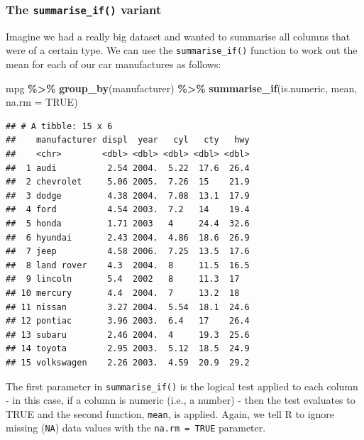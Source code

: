 \documentclass[
]{book}
\newenvironment{Shaded}{\begin{snugshade}}{\end{snugshade}}
\newcommand{\AttributeTok}[1]{\textcolor[rgb]{0.13,0.29,0.53}{#1}}
\newcommand{\ConstantTok}[1]{\textcolor[rgb]{0.56,0.35,0.01}{#1}}
\newcommand{\FunctionTok}[1]{\textcolor[rgb]{0.13,0.29,0.53}{\textbf{#1}}}
\newcommand{\NormalTok}[1]{#1}
\newcommand{\SpecialCharTok}[1]{\textcolor[rgb]{0.81,0.36,0.00}{\textbf{#1}}}
\begin{document}
\hypertarget{the-summarise_if-variant}{%
\subsubsection*{\texorpdfstring{The \texttt{summarise\_if()} variant}{The summarise\_if() variant}}\label{the-summarise_if-variant}}

Imagine we had a really big dataset and wanted to summarise all columns that were of a certain type. We can use the \texttt{summarise\_if()} function to work out the mean for each of our car manufactures as follows:

\begin{Shaded}
\begin{Highlighting}[]
\NormalTok{mpg }\SpecialCharTok{\%\textgreater{}\%} 
  \FunctionTok{group\_by}\NormalTok{(manufacturer) }\SpecialCharTok{\%\textgreater{}\%}
  \FunctionTok{summarise\_if}\NormalTok{(is.numeric, mean, }\AttributeTok{na.rm =} \ConstantTok{TRUE}\NormalTok{)}
\end{Highlighting}
\end{Shaded}

\begin{verbatim}
## # A tibble: 15 x 6
##    manufacturer displ  year   cyl   cty   hwy
##    <chr>        <dbl> <dbl> <dbl> <dbl> <dbl>
##  1 audi          2.54 2004.  5.22  17.6  26.4
##  2 chevrolet     5.06 2005.  7.26  15    21.9
##  3 dodge         4.38 2004.  7.08  13.1  17.9
##  4 ford          4.54 2003.  7.2   14    19.4
##  5 honda         1.71 2003   4     24.4  32.6
##  6 hyundai       2.43 2004.  4.86  18.6  26.9
##  7 jeep          4.58 2006.  7.25  13.5  17.6
##  8 land rover    4.3  2004.  8     11.5  16.5
##  9 lincoln       5.4  2002   8     11.3  17  
## 10 mercury       4.4  2004.  7     13.2  18  
## 11 nissan        3.27 2004.  5.54  18.1  24.6
## 12 pontiac       3.96 2003.  6.4   17    26.4
## 13 subaru        2.46 2004.  4     19.3  25.6
## 14 toyota        2.95 2003.  5.12  18.5  24.9
## 15 volkswagen    2.26 2003.  4.59  20.9  29.2
\end{verbatim}

The first parameter in \texttt{summarise\_if()} is the logical test applied to each column - in this case, if a column is numeric (i.e., a number) - then the test evaluates to TRUE and the second function, \texttt{mean}, is applied. Again, we tell R to ignore missing (\texttt{NA}) data values with the \texttt{na.rm\ =\ TRUE} parameter.
\end{document}

